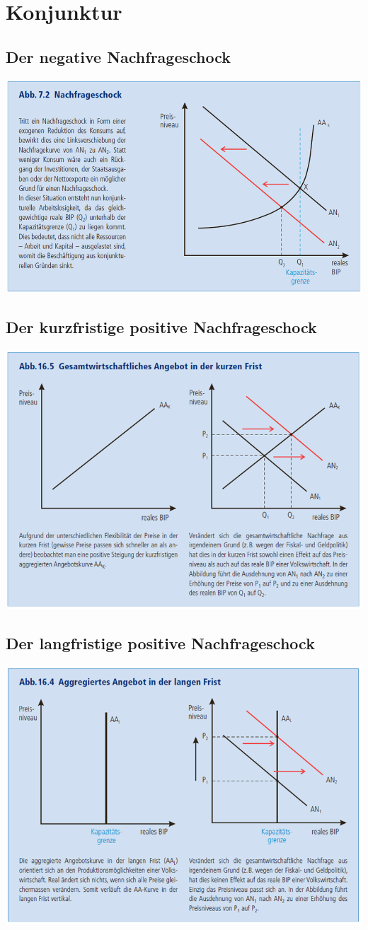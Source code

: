 \section{Konjunktur}
\subsection{Der negative Nachfrageschock}
\includegraphics[width=0.85\linewidth]{images/negnach.png}
\subsection{Der kurzfristige positive Nachfrageschock}
\includegraphics[width=0.85\linewidth]{images/posnachkurz.png}
\clearpage
\pagebreak
\subsection{Der langfristige positive Nachfrageschock}
\includegraphics[width=0.85\linewidth]{images/posnachlang.png}
